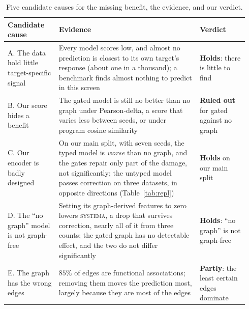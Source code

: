 \documentclass{article}
\begin{document}
\begin{table}[t]
\centering
\caption{Five candidate causes for the missing benefit, the evidence, and our verdict.}
\label{tab:causes}
\vspace{2pt}
{\footnotesize
\begin{tabular}{@{}>{\raggedright\arraybackslash}p{0.2\linewidth}>{\raggedright\arraybackslash}p{0.55\linewidth}>{\raggedright\arraybackslash}p{0.19\linewidth}@{}}
\toprule
Candidate cause & Evidence & Verdict \\
\midrule
A. The data hold little target-specific signal & Every model scores low, and almost no prediction is closest to its own target's response (about one in a thousand); a benchmark finds almost nothing to predict in this screen \citep{royer2026tfm} & \textbf{Holds}: there is little to find \\
B. Our score hides a benefit & The gated model is still no better than no graph under Pearson-delta, a score that varies less between seeds, or under program cosine similarity & \textbf{Ruled out} for gated against no graph \\
C. Our encoder is badly designed & On our main split, with seven seeds, the typed model is \emph{worse} than no graph, and the gates repair only part of the damage, not significantly; the untyped model passes correction on three datasets, in opposite directions (Table~\ref{tab:repl}) & \textbf{Holds} on our main split \\
D. The ``no graph'' model is not graph-free & Setting its graph-derived features to zero lowers \textsc{systema}, a drop that survives correction, nearly all of it from three counts; the gated graph has no detectable effect, and the two do not differ significantly & \textbf{Holds}: ``no graph'' is not graph-free \\
E. The graph has the wrong edges & $85\%$ of edges are functional associations; removing them moves the prediction most, largely because they are most of the edges & \textbf{Partly}: the least certain edges dominate \\
\bottomrule
\end{tabular}}
\end{table}
\end{document}
